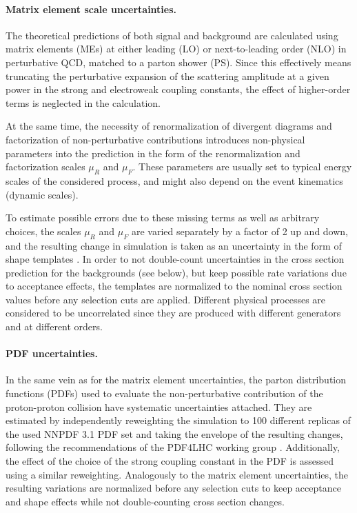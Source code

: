 \paragraph{Matrix element scale uncertainties.}

The theoretical predictions of both signal and background are calculated using matrix elements (MEs) at either leading (LO) or next-to-leading order (NLO) in perturbative QCD, matched to a parton shower (PS). Since this effectively means truncating the perturbative expansion of the scattering amplitude at a given power in the strong and electroweak coupling constants, the effect of higher-order terms is neglected in the calculation.

At the same time, the necessity of renormalization of divergent diagrams and factorization of non-perturbative contributions introduces non-physical parameters into the prediction in the form of the renormalization and factorization scales $\mu_R$ and $\mu_F$. These parameters are usually set to typical energy scales of the considered process, and might also depend on the event kinematics (dynamic scales).

To estimate possible errors due to these missing terms as well as arbitrary choices, the scales $\mu_R$ and $\mu_F$ are varied separately by a factor of 2 up and down, and the resulting change in simulation is taken as an uncertainty in the form of shape templates \cite{Cacciari:2004}. In order to not double-count uncertainties in the cross section prediction for the backgrounds (see below), but keep possible rate variations due to acceptance effects, the templates are normalized to the nominal cross section values before any selection cuts are applied. Different physical processes are considered to be uncorrelated since they are produced with different generators and at different orders. 

\paragraph{PDF uncertainties.}

In the same vein as for the matrix element uncertainties, the parton distribution functions (PDFs) used to evaluate the non-perturbative contribution of the proton-proton collision have systematic uncertainties attached. They are estimated by independently reweighting the simulation to 100 different replicas of the used NNPDF 3.1 PDF set and taking the envelope of the resulting changes, following the recommendations of the PDF4LHC working group \cite{Butterworth:2015oua}. Additionally, the effect of the choice of the strong coupling constant in the PDF is assessed using a similar reweighting. Analogously to the matrix element uncertainties, the resulting variations are normalized before any selection cuts to keep acceptance and shape effects while not double-counting cross section changes.

